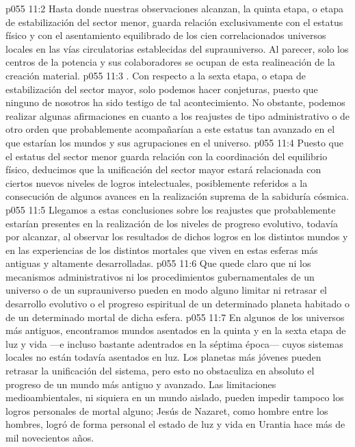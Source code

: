 \vs p055 11:2 \pc {} Hasta donde nuestras observaciones alcanzan, la quinta etapa, o etapa de estabilización del sector menor, guarda relación exclusivamente con el estatus físico y con el asentamiento equilibrado de los cien correlacionados universos locales en las vías circulatorias establecidas del suprauniverso. Al parecer, solo los centros de la potencia y sus colaboradores se ocupan de esta realineación de la creación material.
\vs p055 11:3 \pc {}. Con respecto a la sexta etapa, o etapa de estabilización del sector mayor, solo podemos hacer conjeturas, puesto que ninguno de nosotros ha sido testigo de tal acontecimiento. No obstante, podemos realizar algunas afirmaciones en cuanto a los reajustes de tipo administrativo o de otro orden que probablemente acompañarían a este estatus tan avanzado en el que estarían los mundos y sus agrupaciones en el universo.
\vs p055 11:4 Puesto que el estatus del sector menor guarda relación con la coordinación del equilibrio físico, deducimos que la unificación del sector mayor estará relacionada con ciertos nuevos niveles de logros intelectuales, posiblemente referidos a la consecución de algunos avances en la realización suprema de la sabiduría cósmica.
\vs p055 11:5 \pc Llegamos a estas conclusiones sobre los reajustes que probablemente estarían presentes en la realización de los niveles de progreso evolutivo, todavía por alcanzar, al observar los resultados de dichos logros en los distintos mundos y en las experiencias de los distintos mortales que viven en estas esferas más antiguas y altamente desarrolladas.
\vs p055 11:6 Que quede claro que ni los mecanismos administrativos ni los procedimientos gubernamentales de un universo o de un suprauniverso pueden en modo alguno limitar ni retrasar el desarrollo evolutivo o el progreso espiritual de un determinado planeta habitado o de un determinado mortal de dicha esfera.
\vs p055 11:7 En algunos de los universos más antiguos, encontramos mundos asentados en la quinta y en la sexta etapa de luz y vida ---e incluso bastante adentrados en la séptima época--- cuyos sistemas locales no están todavía asentados en luz. Los planetas más jóvenes pueden retrasar la unificación del sistema, pero esto no obstaculiza en absoluto el progreso de un mundo más antiguo y avanzado. Las limitaciones medioambientales, ni siquiera en un mundo aislado, pueden impedir tampoco los logros personales de mortal alguno; Jesús de Nazaret, como hombre entre los hombres, logró de forma personal el estado de luz y vida en Urantia hace más de mil novecientos años.
